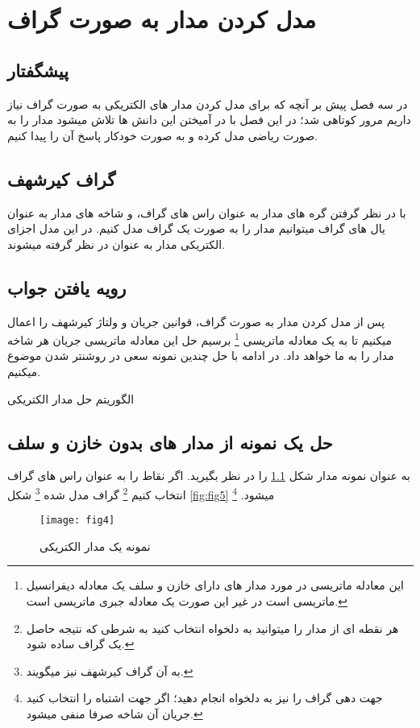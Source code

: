 \chapter{مدل کردن مدار به صورت گراف}
\label{chap:results}
\section{پیشگفتار} 
در سه فصل پیش بر آنچه که برای مدل کردن مدار های الکتریکی به صورت گراف نیاز داریم
مرور کوتاهی شد؛ در این فصل با در آمیختن این دانش ها تلاش میشود مدار را به صورت ریاضی مدل کرده
و به صورت خودکار پاسخ آن را پیدا کنیم.
\section{گراف کیرشهف}
با در نظر گرفتن گره های مدار به عنوان راس های گراف، و شاخه های مدار به عنوان یال های گراف
میتوانیم مدار را به صورت یک گراف مدل کنیم.
در این مدل اجزای الکتریکی مدار به عنوان 
در نظر گرفته میشوند.
\section{رویه یافتن جواب}
پس از مدل کردن مدار به صورت گراف، قوانین جریان و ولتاژ کیرشهف را اعمال میکنیم تا به یک
معادله ماتریسی
\footnote{
	این معادله ماتریسی در مورد مدار های دارای خازن و سلف یک معادله دیفرانسیل ماتریسی است
	در غیر این صورت یک معادله جبری ماتریسی است.
}
برسیم حل این معادله ماتریسی جریان هر شاخه مدار را به ما خواهد داد.
\cite{thulasiraman02}
\cite{Berdewad14}
در ادامه با حل چندین نمونه سعی در روشنتر شدن موضوع میکنیم.
\begin{algorithm}[ht]
	\onehalfspacing
	\caption{الگوریتم حل مدار الکتریکی
	} 
	\label{euler}
	\begin{algorithmic}[1]
		\REQUIRE
		\ENSURE
		\STATE
		\STATE
		\STATE
		\STATE
		\STATE
		\STATE
		
	\end{algorithmic}
\end{algorithm}
\section{حل یک نمونه از مدار های بدون خازن و سلف}
\label{section:ex1}
به عنوان نمونه مدار شکل 
\ref{fig:fig4}
را در نظر بگیرید.
اگر نقاط
را به عنوان راس های گراف انتخاب کنیم
\footnote{
	هر نقطه ای از مدار را میتوانید به دلخواه انتخاب کنید به شرطی که
	نتیجه حاصل یک گراف ساده شود.
}
گراف مدل شده
\footnote{
	به آن گراف کیرشهف نیز میگویند.
}
شکل
\ref{fig:fig5}
میشود.
\footnote{
	جهت دهی گراف را نیز به دلخواه انجام دهید؛ اگر جهت اشتباه را انتخاب کنید جریان آن شاخه صرفا منفی میشود.
}
\begin{figure}[ht]
	\centerline{\texttt{[image: fig4]}}
	\caption{نمونه یک مدار الکتریکی }
	\label{fig:fig4}
\end{figure}

